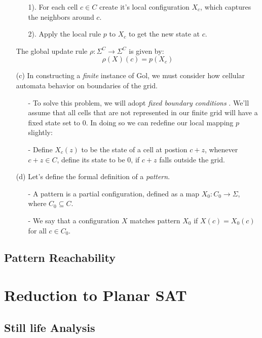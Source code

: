 \documentclass{article}
\theoremstyle{definition}
\theoremstyle{plain}
\theoremstyle{plain}
\begin{document}
\begin{enumerate}
\begin{enumerate}
          \item[1).] For each cell $c \in C$ create it's local configuration $X_c$, which captures the neighbors around $c$.
          \item[2).] Apply the local rule $p$ to $X_c$ to get the new state at $c$.
        \end{enumerate}
        The global update rule $\rho : \Sigma^C \to \Sigma^C$ is  given by:
        \begin {equation}
        \rho(X)(c) = p(X_c)
        \end {equation}
      \item[(c)] In constructing a \textit{finite} instance of Gol, we must consider how cellular automata behavior on boundaries of the grid.
        \begin{enumerate}
          \item[-] To solve this problem, we will adopt \textit{fixed boundary conditions} \cite{SUTNER199587}. We'll assume that all cells that are not represented in our finite grid will have a fixed state set to $0$. In doing so we can redefine our local mapping $p$ slightly: 
          \item[-] Define $X_c(z)$ to be the state of a cell at postion $c + z$, whenever $c + z \in C$, define its state to be 0, if $c + z$ falls outside the grid.
        \end{enumerate}
      \item[(d)] Let's define the formal definition of a \textit{pattern}. \cite{SUTNER199587}
        \begin{enumerate}
           \item[-] A pattern is a partial configuration, defined as a map $X_0: C_0 \to \Sigma$, where $C_0 \subseteq C$.
    \item[-] We say that a configuration $X$ matches pattern $X_0$ if $X(c) = X_0(c)$ for all $c \in C_0$.
        \end{enumerate}
\end{enumerate}
\subsection{Pattern Reachability}
\section{Reduction to Planar SAT}

\subsection{Still life Analysis}
\end{document}
